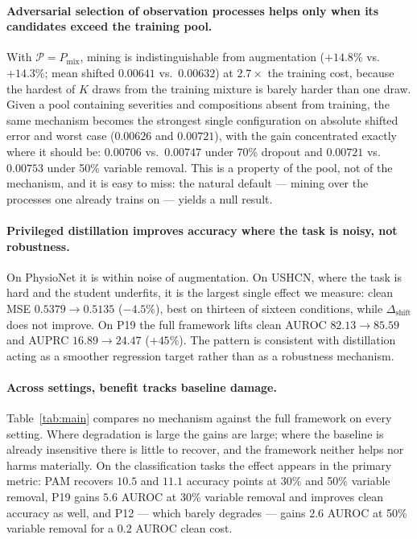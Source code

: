 \documentclass[sigconf,nonacm]{acmart}
\begin{document}
\paragraph{Adversarial selection of observation processes helps only when its candidates exceed the training
pool.} With $\mathcal{P}=P_{\mathrm{mix}}$, mining is indistinguishable from augmentation ($+14.8\%$ vs.\
$+14.3\%$; mean shifted $0.00641$ vs.\ $0.00632$) at $2.7\times$ the training cost, because the hardest of $K$
draws from the training mixture is barely harder than one draw. Given a pool containing severities and
compositions absent from training, the same mechanism becomes the strongest single configuration on absolute
shifted error and worst case ($0.00626$ and $0.00721$), with the gain concentrated exactly where it should be:
$0.00706$ vs.\ $0.00747$ under 70\% dropout and $0.00721$ vs.\ $0.00753$ under 50\% variable removal. This is a
property of the pool, not of the mechanism, and it is easy to miss: the natural default --- mining over the
processes one already trains on --- yields a null result.

\paragraph{Privileged distillation improves accuracy where the task is noisy, not robustness.}
On PhysioNet it is within noise of augmentation. On USHCN, where the task is hard and the student underfits, it
is the largest single effect we measure: clean MSE $0.5379\to0.5135$ ($-4.5\%$), best on thirteen of sixteen
conditions, while $\Delta_{\mathrm{shift}}$ does not improve. On P19 the full framework lifts clean AUROC
$82.13\to85.59$ and AUPRC $16.89\to24.47$ ($+45\%$). The pattern is consistent with distillation acting as a
smoother regression target rather than as a robustness mechanism.

\paragraph{Across settings, benefit tracks baseline damage.}
Table~\ref{tab:main} compares no mechanism against the full framework on every setting. Where degradation is
large the gains are large; where the baseline is already insensitive there is little to recover, and the
framework neither helps nor harms materially. On the classification tasks the effect appears in the primary
metric: PAM recovers $10.5$ and $11.1$ accuracy points at 30\% and 50\% variable removal, P19 gains $5.6$ AUROC
at 30\% variable removal and improves clean accuracy as well, and P12 --- which barely degrades --- gains $2.6$
AUROC at 50\% variable removal for a $0.2$ AUROC clean cost.
\end{document}
